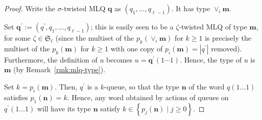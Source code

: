 \documentclass[reqno]{amsart}%
\newcommand{\0}{\phantom{c}}
\newcommand{\merge}[1]{\vee_{#1}}
\newcommand{\SymGp}[1]{\mathfrak{S}_{#1}}
\newcommand{\mm}{\mathbf{m}}
\newcommand{\set}[1]{\left\{ #1 \right\}}
\newcommand{\tup}[1]{\left( #1 \right)}
\theoremstyle{plain}
\theoremstyle{definition}
\numberwithin{equation}{section}
\begin{document}
\begin{proof}
\begin{comment}
Let us first show an auxiliary observation.
Let $q$, $u$ and $t$ be as in Remark~\ref{rmk:t-splitting},
and let $h \in \set{1, 2, \ldots}$.
The permutation $\tup{i_1, i_2, \ldots, i_n}$ in the construction of $q(u)$
also works for the construction of $q(\merge{h} u)$,
since $(\merge{h} u)_a \leq (\merge{h} u)_b$ whenever $u_a \leq u_b$.
Thus, the construction of $q(\merge{h} u)$ proceeds exactly as the
construction of $q(u)$, except that the letters used to build
the former word are those of $\merge{h} u$ instead of those of $u$.
This yields an expression for each letter $(q(\merge{h} u))_i$ of
$q(\merge{h} u)$ depending on whether ...
\begin{equation}
q(\merge{h} u) = \begin{cases}
\merge{h} q(u) , & \text{ if } h < t ; \\
\merge{h+1} q(u) , & \text{ if } h \geq t
\end{cases} .
\label{pf.lemma:queue_merge.1}
\end{equation}
\end{comment}
Write the $\sigma$-twisted MLQ $\mathbf{q}$ as $\left(  q_{1}, \ldots,
q_{\ell-1} \right)  $. It has type $\vee_{i} \mathbf{m}$.



Set $\mathbf{q}^{\prime}:= \left(  q^{\prime}, q_{1}, \ldots, q_{\ell-1}
\right)  $; this is easily seen to be a $\zeta$-twisted MLQ of type
$\mathbf{m}$, for some $\zeta\in\mathfrak{S}_{\ell}$ (since the multiset of
the $p_{k}(\vee_{i}\mathbf{m})$ for $k \geq1$ is precisely the multiset of the
$p_{k}(\mathbf{m})$ for $k \geq1$ with one copy of $p_{i}(\mathbf{m}) =
\left|  q^{\prime}\right|  $ removed). Furthermore, the definition of $u$
becomes $u = \mathbf{q}^{\prime}(1 \dotsm1)$. Hence, the type of $u$ is
$\mathbf{m}$ (by Remark~\ref{rmk:mlq-type}).

Set $k = p_{i}(\mathbf{m})$. Then, $q^{\prime}$ is a $k$-queue, so that the
type $\mathbf{n}$ of the word $q(1 \dots1)$ satisfies $p_{1}(\mathbf{n}) = k$.
Hence, any word obtained by actions of queues on $q^{\prime}(1 \dots1)$ will
have its type $\mathbf{n}$ satisfy $k \in\left\{  p_{j}(\mathbf{n}) \mid j
\geq0 \right\}  $.


\end{proof}
\end{document}

